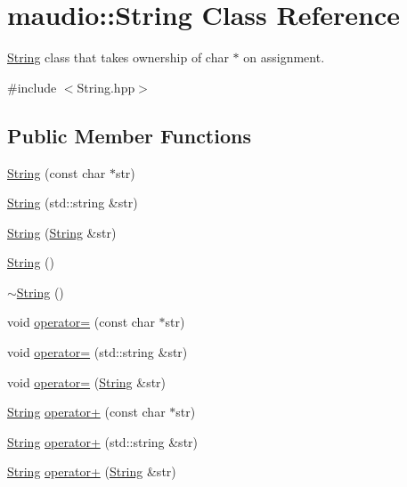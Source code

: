 \hypertarget{classmaudio_1_1String}{\section{maudio\-:\-:String Class Reference}
\label{classmaudio_1_1String}
}


\hyperlink{classmaudio_1_1String}{String} class that takes ownership of char $\ast$ on assignment.  




{\ttfamily \#include $<$String.\-hpp$>$}

\subsection*{Public Member Functions}
\begin{DoxyCompactItemize}
\item 
\hyperlink{classmaudio_1_1String_a2bac952e0fed8b183e7237f21809c036}{String} (const char $\ast$str)
\item 
\hyperlink{classmaudio_1_1String_af59f71d8f2bd1a3bafb1465cb14d1695}{String} (std\-::string \&str)
\item 
\hyperlink{classmaudio_1_1String_a8fe4640606066a14ba9e20693b37970a}{String} (\hyperlink{classmaudio_1_1String}{String} \&str)
\item 
\hyperlink{classmaudio_1_1String_a52921366bd27607e49d7509e59c495f8}{String} ()
\item 
\hyperlink{classmaudio_1_1String_af01cfc8ce9cc4aed297bba9e76ff0620}{$\sim$\-String} ()
\item 
void \hyperlink{classmaudio_1_1String_adb7b2e29350e86fd918b3ba3ace022bd}{operator=} (const char $\ast$str)
\item 
void \hyperlink{classmaudio_1_1String_a01e25e04b7af83282f109634b49980ae}{operator=} (std\-::string \&str)
\item 
void \hyperlink{classmaudio_1_1String_a84602c0e9f1e34e9f13c1f8813d94925}{operator=} (\hyperlink{classmaudio_1_1String}{String} \&str)
\item 
\hyperlink{classmaudio_1_1String}{String} \hyperlink{classmaudio_1_1String_a475e22a48bb7e3aa2d7889d78c53bba4}{operator+} (const char $\ast$str)
\item 
\hyperlink{classmaudio_1_1String}{String} \hyperlink{classmaudio_1_1String_a79214e85834f6643cd97830faf9dbf12}{operator+} (std\-::string \&str)
\item 
\hyperlink{classmaudio_1_1String}{String} \hyperlink{classmaudio_1_1String_ab5b1abe9747c3bf8dc99ca9e5bfb703e}{operator+} (\hyperlink{classmaudio_1_1String}{String} \&str)

\end{DoxyCompactItemize}
